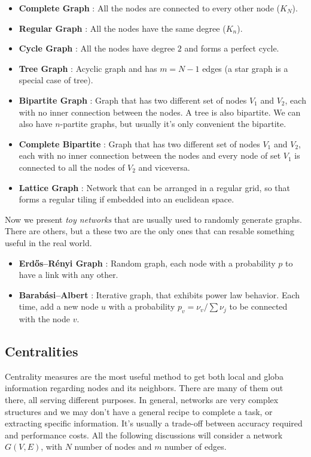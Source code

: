 \documentclass[12pt,a4paper]{article}
\begin{document}
\begin{itemize}
	\item \textbf{Complete Graph} : All the nodes are connected to every other node ($K_N$).
	\item \textbf{Regular Graph} : All the nodes have the same degree ($K_n$).
	\item \textbf{Cycle Graph} : All the nodes have degree $2$ and forms a perfect cycle.
	\item \textbf{Tree Graph} : Acyclic graph and has $m=N-1$ edges (a star graph is a special case of tree).
	\item \textbf{Bipartite Graph} : Graph that has two different set of nodes $V_1$ and $V_2$, each with no inner connection between the nodes. A tree is also bipartite. We can also have $n$-partite graphs, but usually it's only convenient the bipartite.
	\item \textbf{Complete Bipartite} : Graph that has two different set of nodes $V_1$ and $V_2$, each with no inner connection between the nodes and every node of set $V_1$ is connected to all the nodes of $V_2$ and viceversa.
	\item \textbf{Lattice Graph} : Network that can be arranged in a regular grid, so that forms a regular tiling if embedded into an euclidean space.
\end{itemize}


Now we present \textit{toy networks} that are usually used to randomly generate graphs. There are others, but a these two are the only ones that can resable something useful in the real world.
\begin{itemize}
	\item \textbf{Erdős–Rényi Graph} : Random graph, each node with a probability $p$ to have a link with any other.
	\item \textbf{Barabási–Albert} : Iterative graph, that exhibits power law behavior. Each time, add a new node $u$ with a probability $p_v = \nu_v / \sum\nu_j$ to be connected with the node $v$.
\end{itemize}


\subsection{Centralities}
Centrality measures are the most useful method to get both local and globa information regarding nodes and its neighbors. There are many of them out there, all serving different purposes.
In general, networks are very complex structures and we may don't have a general recipe to complete a task, or extracting specific information. It's usually a trade-off between accuracy required and performance costs.
All the following discussions will consider a network $G(V,E)$, with $N$ number of nodes and $m$ number of edges.
\end{document}
